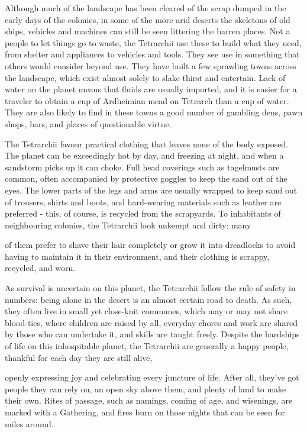 Although much of the landscape has been cleared of the scrap dumped in the early days of the colonies, in some of the more arid deserts the skeletons of old ships, vehicles and machines can still be seen littering the barren places. Not a people to let things go to waste, the Tetrarchii use these to build what they need, from shelter and appliances to vehicles and tools. They see use in something that others would consider beyond use. They have built a few sprawling towns across the landscape, which exist almost solely to slake thirst and entertain. Lack of water on the planet means that fluids are usually imported, and it is easier for a traveler to obtain a cup of Ardheimian mead on Tetrarch than a cup of water. They are also likely to find in these towns a good number of gambling dens, pawn shops, bars, and places of questionable virtue.

The Tetrarchii favour practical clothing that leaves none of the body exposed. The planet can be exceedingly hot by day, and freezing at night, and when a sandstorm picks up it can choke. Full head coverings such as tagelmusts are common, often accompanied by protective goggles to keep the sand out of the eyes. The lower parts of the legs and arms are usually wrapped to keep sand out of trousers, shirts and boots, and hard-wearing materials such as leather are preferred - this, of course, is recycled from the scrapyards. To inhabitants of neighbouring colonies, the Tetrarchii look unkempt and dirty: many

of them prefer to shave their hair completely or grow it into dreadlocks to avoid having to maintain it in their environment, and their clothing is scrappy, recycled, and worn.

As survival is uncertain on this planet, the Tetrarchii follow the rule of safety in numbers: being alone in the desert is an almost certain road to death. As such, they often live in small yet close-knit communes, which may or may not share blood-ties, where children are raised by all, everyday chores and work are shared by those who can undertake it, and skills are taught freely. Despite the hardships of life on this inhospitable planet, the Tetrarchii are generally a happy people, thankful for each day they are still alive,

openly expressing joy and celebrating every juncture of life. After all, they've got people they can rely on, an open sky above them, and plenty of land to make their own. Rites of passage, such as namings, coming of age, and wisenings, are marked with a Gathering, and fires burn on those nights that can be seen for miles around.

